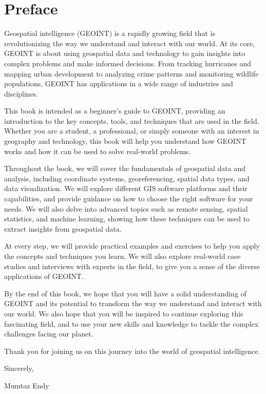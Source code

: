 

\chapter*{Preface}

Geospatial intelligence (GEOINT) is a rapidly growing field that is revolutionizing the way we understand and interact with our world. At its core, GEOINT is about using geospatial data and technology to gain insights into complex problems and make informed decisions. From tracking hurricanes and mapping urban development to analyzing crime patterns and monitoring wildlife populations, GEOINT has applications in a wide range of industries and disciplines. 

This book is intended as a beginner's guide to GEOINT, providing an introduction to the key concepts, tools, and techniques that are used in the field. Whether you are a student, a professional, or simply someone with an interest in geography and technology, this book will help you understand how GEOINT works and how it can be used to solve real-world problems.

Throughout the book, we will cover the fundamentals of geospatial data and analysis, including coordinate systems, georeferencing, spatial data types, and data visualization. We will explore different GIS software platforms and their capabilities, and provide guidance on how to choose the right software for your needs. We will also delve into advanced topics such as remote sensing, spatial statistics, and machine learning, showing how these techniques can be used to extract insights from geospatial data.

At every step, we will provide practical examples and exercises to help you apply the concepts and techniques you learn. We will also explore real-world case studies and interviews with experts in the field, to give you a sense of the diverse applications of GEOINT.

By the end of this book, we hope that you will have a solid understanding of GEOINT and its potential to transform the way we understand and interact with our world. We also hope that you will be inspired to continue exploring this fascinating field, and to use your new skills and knowledge to tackle the complex challenges facing our planet.

Thank you for joining us on this journey into the world of geospatial intelligence.

Sincerely,

Mumtaz Endy